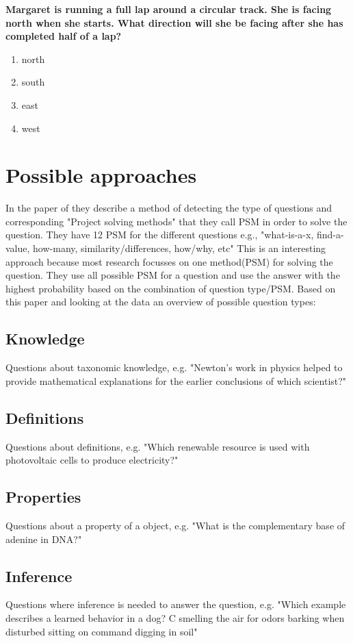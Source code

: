 \documentclass[11pt]{amsart}
\begin{document}
\vspace{5mm}
\noindent \textbf{Margaret is running a full lap around a circular track. She is facing north when she starts. What direction will she be facing after she has completed half of a lap?}
\begin{enumerate}[a]
\item north
\item south
\item east
\item west
\end{enumerate}


			
\section{Possible approaches}
In the paper of \cite{clark2013study} they describe a method of detecting the type of questions and corresponding "Project solving methods" that they call PSM in order to solve the question. They have 12 PSM for the different questions e.g., "what-is-a-x, find-a-value, how-many, similarity/differences, how/why, etc"  This is an interesting approach because most research focusses on one method(PSM) for solving the question. They use all possible PSM for a question and use the answer with the highest probability based on the combination of question type/PSM. Based on this paper and looking at the data an overview of possible question types:

\subsection{Knowledge}
Questions about taxonomic knowledge,  e.g. "Newton's work in physics helped to provide mathematical explanations for the earlier conclusions of which scientist?"

\subsection{Definitions}
Questions about definitions, e.g. "Which renewable resource is used with photovoltaic cells to produce electricity?" 

\subsection{Properties}
Questions about a property of a object, e.g. "What is the complementary base of adenine in DNA?"

\subsection{Inference}
Questions where inference is needed to answer the question, e.g. "Which example describes a learned behavior in a dog?	C	smelling the air for odors	barking when disturbed	sitting on command	digging in soil"
\end{document}
